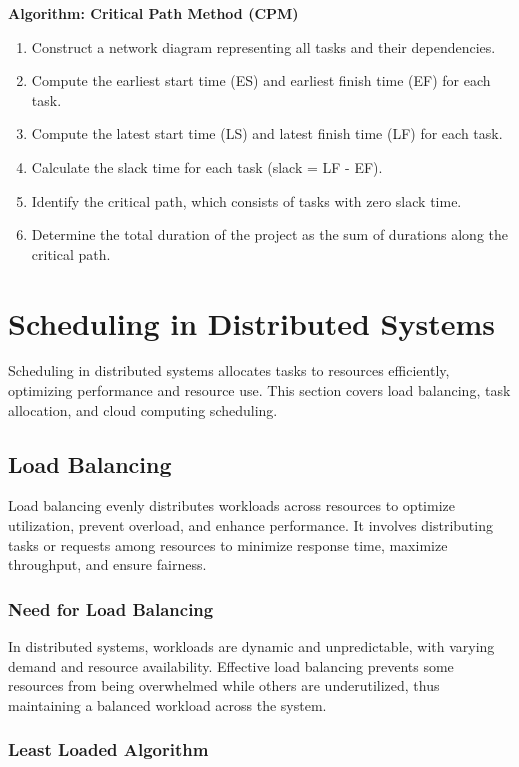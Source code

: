 \documentclass[12pt]{book} %
\begin{document}
\textbf{Algorithm: Critical Path Method (CPM)}
\begin{enumerate}
    \item Construct a network diagram representing all tasks and their dependencies.
    \item Compute the earliest start time (ES) and earliest finish time (EF) for each task.
    \item Compute the latest start time (LS) and latest finish time (LF) for each task.
    \item Calculate the slack time for each task (slack = LF - EF).
    \item Identify the critical path, which consists of tasks with zero slack time.
    \item Determine the total duration of the project as the sum of durations along the critical path.
\end{enumerate}

\section{Scheduling in Distributed Systems}

Scheduling in distributed systems allocates tasks to resources efficiently, optimizing performance and resource use. This section covers load balancing, task allocation, and cloud computing scheduling.

\subsection{Load Balancing}

Load balancing evenly distributes workloads across resources to optimize utilization, prevent overload, and enhance performance. It involves distributing tasks or requests among resources to minimize response time, maximize throughput, and ensure fairness.

\subsubsection{Need for Load Balancing}

In distributed systems, workloads are dynamic and unpredictable, with varying demand and resource availability. Effective load balancing prevents some resources from being overwhelmed while others are underutilized, thus maintaining a balanced workload across the system.


\subsubsection{Least Loaded Algorithm}
\end{document}
